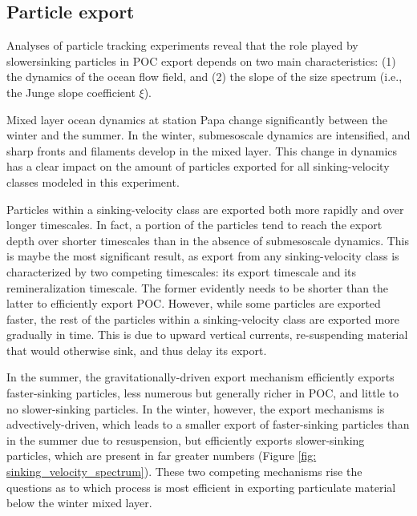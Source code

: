 \documentclass[draft,linenumbers]{agujournal2018}
\begin{document}
\subsection{Particle export}
\label{sec: discussion_particle}

Analyses of particle tracking experiments reveal that the role played by slower\-sinking particles in POC export depends on two main characteristics: (1) the dynamics of the ocean flow field, and (2) the slope of the size spectrum (i.e., the Junge slope coefficient $\xi$).

Mixed layer ocean dynamics at station Papa change significantly between the winter and the summer. In the winter, submesoscale dynamics are intensified, and sharp fronts and filaments develop in the mixed layer. This change in dynamics has a clear impact on the amount of particles exported for all sinking-velocity classes modeled in this experiment. 

Particles within a sinking-velocity class are exported both more rapidly and over longer timescales. In fact, a portion of the particles tend to reach the export depth over shorter timescales than in the absence of submesoscale dynamics. This is maybe the most significant result, as export from any sinking-velocity class is characterized by two competing timescales: its export timescale and its remineralization timescale. The former evidently needs to be shorter than the latter to efficiently export POC. However, while some particles are exported faster, the rest of the particles within a sinking-velocity class are exported more gradually in time. This is due to upward vertical currents, re-suspending material that would otherwise sink, and thus delay its export. 

In the summer, the gravitationally-driven export mechanism efficiently exports faster-sinking particles, less numerous but generally richer in POC, and little to no slower-sinking particles. In the winter, however, the export mechanisms is advectively-driven, which leads to a smaller export of faster-sinking particles than in the summer due to resuspension, but efficiently exports slower-sinking particles, which are present in far greater numbers (Figure \ref{fig: sinking_velocity_spectrum}). These two competing mechanisms rise the questions as to which process is most efficient in exporting particulate material below the winter mixed layer.
\end{document}
